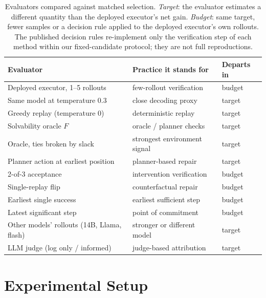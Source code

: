 \documentclass{article}
\theoremstyle{plain}
\theoremstyle{definition}
\theoremstyle{remark}
\begin{document}
\begin{table}[t]
  \caption{Evaluators compared against matched selection. \emph{Target}: the evaluator estimates a different quantity than the deployed executor's net gain. \emph{Budget}: same target, fewer samples or a decision rule applied to the deployed executor's own rollouts. The published decision rules re-implement only the verification step of each method within our fixed-candidate protocol; they are not full reproductions.}
  \label{tab:evaluators}
  \centering
  \footnotesize
  \setlength{\tabcolsep}{3pt}
  \begin{tabular}{@{}p{}p{}l@{}}
    \toprule
    Evaluator & Practice it stands for & Departs in \\
    \midrule
    Deployed executor, 1--5 rollouts & few-rollout verification & budget \\
    Same model at temperature 0.3 & close decoding proxy & target \\
    Greedy replay (temperature 0) & deterministic replay & target \\
    Solvability oracle $F$ & oracle / planner checks & target \\
    Oracle, ties broken by slack & strongest environment signal & target \\
    Planner action at earliest position & planner-based repair & target \\
    2-of-3 acceptance \citep{ma2025dover} & intervention verification & budget \\
    Single-replay flip \citep{bonagiri2026causalflow} & counterfactual repair & budget \\
    Earliest single success \citep{zhang2025agentracer} & earliest sufficient step & budget \\
    Latest significant step \citep{shah2026car} & point of commitment & budget \\
    Other models' rollouts (14B, Llama, flash) & stronger or different model & target \\
    LLM judge (log only / informed) & judge-based attribution & target \\
    \bottomrule
  \end{tabular}
\end{table}

\section{Experimental Setup}
\label{sec:exp}
\end{document}
